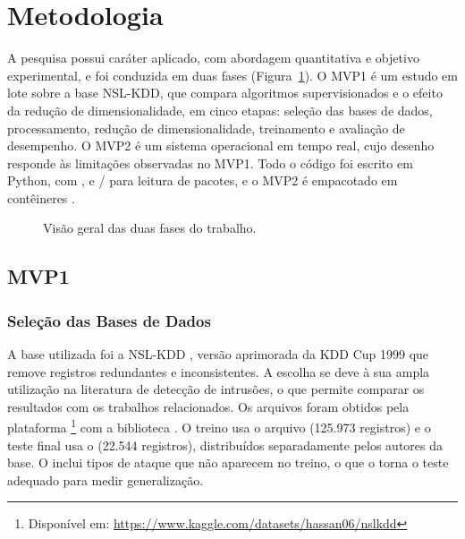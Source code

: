 \section{Metodologia}

A pesquisa possui caráter aplicado, com abordagem quantitativa e objetivo
experimental, e foi conduzida em duas fases (Figura~\ref{fig:fases}). O MVP1 é um
estudo em lote sobre a base NSL-KDD, que compara algoritmos supervisionados e o
efeito da redução de dimensionalidade, em cinco etapas: seleção das bases de dados,
processamento, redução de dimensionalidade, treinamento e avaliação de desempenho.
O MVP2 é um sistema operacional em tempo real, cujo desenho responde às limitações
observadas no MVP1. Todo o código foi escrito em Python, com 
\cite{Pedregosa2011Scikit, scikit2026learn},  e /
para leitura de pacotes, e o MVP2 é empacotado em contêineres 
\cite{Merkel2014Docker}.

\begin{figure}[H]
  \centering
  
  \caption{Visão geral das duas fases do trabalho.}
  \label{fig:fases}
\end{figure}

\subsection{MVP1}
\label{sec:mvp1}

\subsubsection{Seleção das Bases de Dados}

A base utilizada foi a NSL-KDD \cite{Tavallaee2009Detailed}, versão aprimorada da
KDD Cup 1999 que remove registros redundantes e inconsistentes. A escolha se deve
à sua ampla utilização na literatura de detecção de intrusões, o que permite
comparar os resultados com os trabalhos relacionados. Os arquivos foram obtidos
pela plataforma \footnote{Disponível em:
\url{https://www.kaggle.com/datasets/hassan06/nslkdd}} com a biblioteca
. O treino usa o arquivo  (125.973 registros) e o
teste final usa o  (22.544 registros), distribuídos separadamente
pelos autores da base. O  inclui tipos de ataque que não aparecem no
treino, o que o torna o teste adequado para medir generalização.

